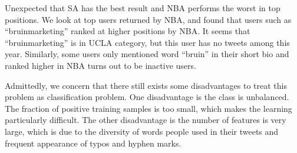 \documentclass{article}
\begin{document}
Unexpected that SA has the best result and NBA performs the worst in top positions. We look at top users returned by NBA, and found that users such as ``bruinmarketing'' ranked at higher positions by NBA. It seems that ``bruinmarketing'' is in UCLA category, but this user has no tweets among this year. Similarly, some users only mentioned word ``bruin'' in their short bio and ranked higher in NBA turns out to be inactive users.

Admittedly, we concern that there still exists some disadvantages to treat this problem as classification problem. One disadvantage is the class is unbalanced. The fraction of positive training samples is too small, which makes the learning particularly difficult. The other disadvantage is the number of features is very large, which is due to the diversity of words people used in their tweets and frequent appearance of typos and hyphen marks.

\ifx \allfiles \undefined
\end{document}
